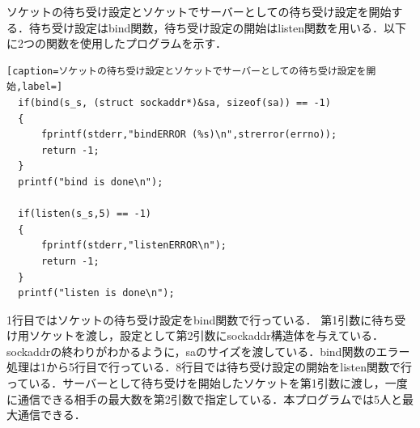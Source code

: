 \documentclass[11pt,a4j,titlepage]{jsarticle}
\begin{document}
ソケットの待ち受け設定とソケットでサーバーとしての待ち受け設定を開始する．待ち受け設定はbind関数，待ち受け設定の開始はlisten関数を用いる．以下に2つの関数を使用したプログラムを示す．
\begin{lstlisting}[caption=ソケットの待ち受け設定とソケットでサーバーとしての待ち受け設定を開始,label=]
  if(bind(s_s, (struct sockaddr*)&sa, sizeof(sa)) == -1)
  {
      fprintf(stderr,"bindERROR (%s)\n",strerror(errno));
      return -1;
  }
  printf("bind is done\n");

  if(listen(s_s,5) == -1)
  {
      fprintf(stderr,"listenERROR\n");
      return -1;
  }
  printf("listen is done\n");
\end{lstlisting}
1行目ではソケットの待ち受け設定をbind関数で行っている．
第1引数に待ち受け用ソケットを渡し，設定として第2引数にsockaddr構造体を与えている．sockaddrの終わりがわかるように，saのサイズを渡している．bind関数のエラー処理は1から5行目で行っている．8行目では待ち受け設定の開始をlisten関数で行っている．サーバーとして待ち受けを開始したソケットを第1引数に渡し，一度に通信できる相手の最大数を第2引数で指定している．本プログラムでは5人と最大通信できる．
\end{document}
